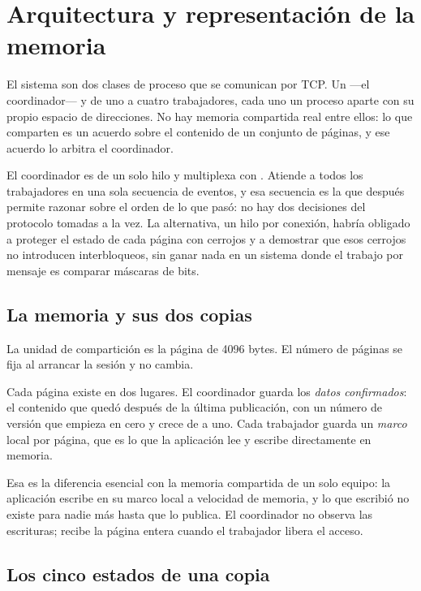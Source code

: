 \section{Arquitectura y representación de la memoria}
\label{sec:arq}

El sistema son dos clases de proceso que se comunican por TCP. Un
 —el coordinador— y de uno a cuatro trabajadores, cada uno
un proceso aparte con su propio espacio de direcciones. No hay memoria
compartida real entre ellos: lo que comparten es un acuerdo sobre el contenido
de un conjunto de páginas, y ese acuerdo lo arbitra el coordinador.

El coordinador es de un solo hilo y multiplexa con . Atiende a
todos los trabajadores en una sola secuencia de eventos, y esa secuencia es la
que después permite razonar sobre el orden de lo que pasó: no hay dos
decisiones del protocolo tomadas a la vez. La alternativa, un hilo por
conexión, habría obligado a proteger el estado de cada página con cerrojos y a
demostrar que esos cerrojos no introducen interbloqueos, sin ganar nada en un
sistema donde el trabajo por mensaje es comparar máscaras de bits.

\subsection{La memoria y sus dos copias}

La unidad de compartición es la página de 4096 bytes. El número de páginas se
fija al arrancar la sesión y no cambia.

Cada página existe en dos lugares. El coordinador guarda los \emph{datos
confirmados}: el contenido que quedó después de la última publicación, con un
número de versión que empieza en cero y crece de a uno. Cada trabajador guarda
un \emph{marco} local por página, que es lo que la aplicación lee y escribe
directamente en memoria.

Esa es la diferencia esencial con la memoria compartida de un solo equipo: la
aplicación escribe en su marco local a velocidad de memoria, y lo que escribió
no existe para nadie más hasta que lo publica. El coordinador no observa las
escrituras; recibe la página entera cuando el trabajador libera el acceso.

\subsection{Los cinco estados de una copia}

